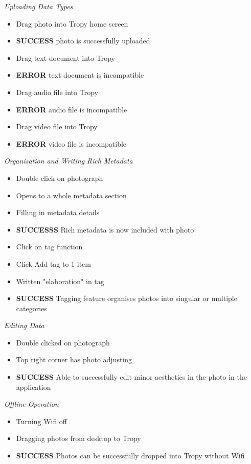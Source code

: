 \documentclass{article}
\begin{document}
\textit{Uploading Data Types}
\begin{itemize}
\item Drag photo into Tropy home screen 
\item \textbf{SUCCESS} photo is successfully uploaded
\item Drag text document into Tropy
\item \textbf{ERROR} text document is incompatible
\item Drag audio file into Tropy
\item \textbf{ERROR} audio file is incompatible
\item Drag video file into Tropy
\item \textbf{ERROR} video file is incompatible
\end{itemize}

\textit{Organisation and Writing Rich Metadata}
\begin{itemize}
\item Double click on photograph
\item Opens to a whole metadata section
\item Filling in metadata details
\item \textbf{SUCCESSS} Rich metadata is now included with photo
\item Click on tag function
\item Click Add tag to 1 item
\item Written "elaboration" in tag
\item \textbf{SUCCESS} Tagging feature organises photos into singular or multiple categories
\end{itemize}

\textit{Editing Data}
\begin{itemize}
\item Double clicked on photograph
\item Top right corner has photo adjusting
\item \textbf{SUCCESS} Able to successfully edit minor aesthetics in the photo in the application
\end{itemize}

\textit{Offline Operation}
\begin{itemize}
\item Turning Wifi off
\item Dragging photos from desktop to Tropy
\item \textbf{SUCCESS} Photos can be successfully dropped into Tropy without Wifi
\end{itemize}
\end{document}

